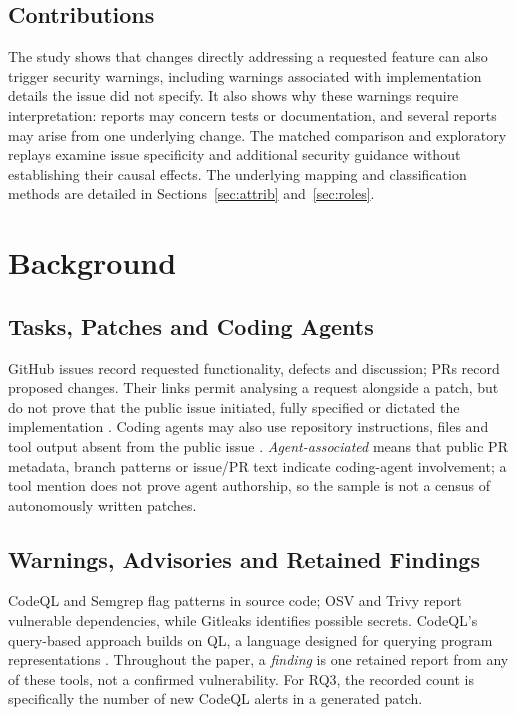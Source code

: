 \documentclass[acmsmall,screen,nonacm]{acmart}
\begin{document}
\subsection{Contributions}

The study shows that changes directly addressing a requested feature can also trigger security warnings, including warnings associated with implementation details the issue did not specify. It also shows why these warnings require interpretation: reports may concern tests or documentation, and several reports may arise from one underlying change. The matched comparison and exploratory replays examine issue specificity and additional security guidance without establishing their causal effects. The underlying mapping and classification methods are detailed in Sections~\ref{sec:attrib} and~\ref{sec:roles}.

\section{Background}

\subsection{Tasks, Patches and Coding Agents}

GitHub issues record requested functionality, defects and discussion; PRs record proposed changes. Their links permit analysing a request alongside a patch, but do not prove that the public issue initiated, fully specified or dictated the implementation \cite{b5}. Coding agents may also use repository instructions, files and tool output absent from the public issue \cite{b20,b22}. \emph{Agent-associated} means that public PR metadata, branch patterns or issue/PR text indicate coding-agent involvement; a tool mention does not prove agent authorship, so the sample is not a census of autonomously written patches.

\subsection{Warnings, Advisories and Retained Findings}

CodeQL and Semgrep flag patterns in source code; OSV and Trivy report vulnerable dependencies, while Gitleaks identifies possible secrets. CodeQL's query-based approach builds on QL, a language designed for querying program representations \cite{b44}. Throughout the paper, a \emph{finding} is one retained report from any of these tools, not a confirmed vulnerability. For RQ3, the recorded count is specifically the number of new CodeQL alerts in a generated patch.
\end{document}
